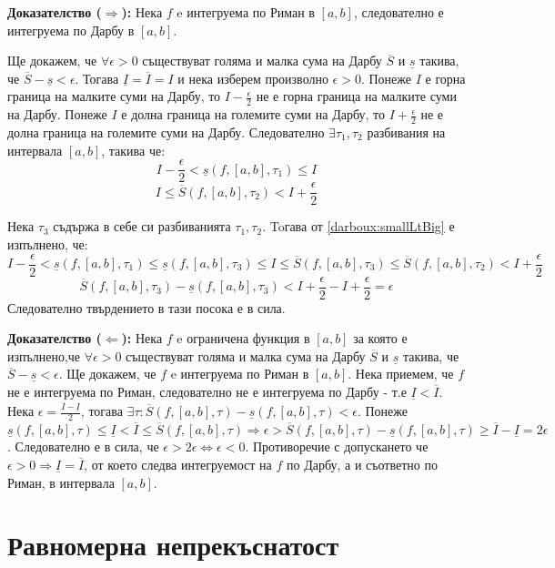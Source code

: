 \documentclass[fleqn,12pt]{article}
\begin{document}
\textbf{Доказателство ($\Longrightarrow$):} Нека $f$ e интегруема по Риман в $[a,b]$, следователно е интегруема по Дарбу в $[a,b]$.

Ще докажем, че $\forall\epsilon > 0$ съществуват голяма и малка сума на Дарбу $\overline{S}$ и $\underline{s}$ такива, че $\overline{S} - \underline{s} < \epsilon$.
Тогава $\underline{I}=\overline{I}=I$ и нека изберем произволно $\epsilon > 0$. Понеже $I$ е горна граница на малките суми на Дарбу, то 
$I - \frac{\epsilon}{2}$ не е горна граница на малките суми на Дарбу. Понеже $I$ е долна граница на големите суми на Дарбу, то $I + \frac{\epsilon}{2}$ не е долна граница на големите суми на Дарбу.
Следователно $\exists \tau_1,\tau_2$ разбивания на интервала $[a,b]$, такива че:
\[ I - \frac{\epsilon}{2} < \underline{s}(f,[a,b],\tau_1) \leq I \]
\[ I \leq \overline{S}(f,[a,b],\tau_2) < I + \frac{\epsilon}{2} \]

Нека $\tau_3$ съдържа в себе си разбиванията $\tau_1,\tau_2$. Toгава от \ref{darboux:smallLtBig} е изпълнено, че:
\[ I - \frac{\epsilon}{2} < \underline{s}(f,[a,b],\tau_1) \leq  \underline{s}(f,[a,b],\tau_3) \leq I \leq \overline{S}(f,[a,b],\tau_3) \leq \overline{S}(f,[a,b],\tau_2) < I + \frac{\epsilon}{2} \]
\[ \overline{S}(f,[a,b],\tau_3) - \underline{s}(f,[a,b],\tau_3) < I + \frac{\epsilon}{2} - I + \frac{\epsilon}{2} = \epsilon \]
Следователно твърдението в тази посока е в сила.

\textbf{Доказателство ($\Longleftarrow$):}
Нека $f$ e ограничена функция в $[a,b]$ за която е изпълнено,че $\forall\epsilon > 0$ съществуват голяма и малка сума на Дарбу $\overline{S}$ и $\underline{s}$ такива, че $\overline{S} - \underline{s} < \epsilon$.
Ще докажем, че $f$ e интегруема по Риман в $[a,b]$. Нека приемем, че $f$ не е интегруема по Риман, следователно не е интегруема по Дарбу - т.е $\underline{I} < \overline{I}$.
Нека $\epsilon = \frac{\overline{I} - \underline{I}}{2}$, тогава $\exists\tau : \overline{S}(f,[a,b],\tau) - \underline{s}(f,[a,b],\tau) < \epsilon$.
Понеже $\underline{s}(f,[a,b],\tau) \leq \underline{I} < \overline{I} \leq \overline{S}(f,[a,b],\tau) \Longrightarrow \epsilon > \overline{S}(f,[a,b],\tau) - \underline{s}(f,[a,b],\tau) \geq \overline{I} - \underline{I} = 2\epsilon$.
Следователно е в сила, че $\epsilon > 2\epsilon \Leftrightarrow \epsilon < 0$.
Противоречие с допускането че $\epsilon>0 \Longrightarrow \underline{I}=\overline{I}$, от което следва интегруемост на $f$ по Дарбу, а и съответно по Риман, в интервала $[a,b]$.

\section{Равномерна непрекъснатост}
\end{document}
